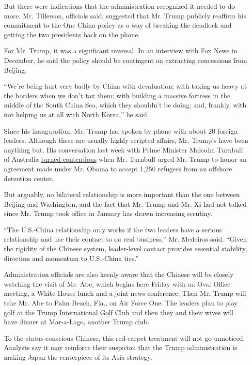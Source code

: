 But there were indications that the administration recognized it needed
to do more. Mr. Tillerson, officials said, suggested that Mr. Trump
publicly reaffirm his commitment to the One China policy as a way of
breaking the deadlock and getting the two presidents back on the phone.

For Mr. Trump, it was a significant reversal. In an interview with Fox
News in December, he said the policy should be contingent on extracting
concessions from Beijing.

``We're being hurt very badly by China with devaluation; with taxing us
heavy at the borders when we don't tax them; with building a massive
fortress in the middle of the South China Sea, which they shouldn't be
doing; and, frankly, with not helping us at all with North Korea,'' he
said.

Since his inauguration, Mr. Trump has spoken by phone with about 20
foreign leaders. Although these are usually highly scripted affairs, Mr.
Trump's have been anything but. His conversation last week with Prime
Minister Malcolm Turnbull of Australia
\href{https://www.nytimes.com/2017/02/02/us/politics/us-australia-trump-turnbull.html}{turned
contentious} when Mr. Turnbull urged Mr. Trump to honor an agreement
made under Mr. Obama to accept 1,250 refugees from an offshore detention
center.

But arguably, no bilateral relationship is more important than the one
between Beijing and Washington, and the fact that Mr. Trump and Mr. Xi
had not talked since Mr. Trump took office in January has drawn
increasing scrutiny.

``The U.S.-China relationship only works if the two leaders have a
serious relationship and use their contact to do real business,'' Mr.
Medeiros said. ``Given the rigidity of the Chinese system, leader-level
contact provides essential stability, direction and momentum to
U.S.-China ties.''

Administration officials are also keenly aware that the Chinese will be
closely watching the visit of Mr. Abe, which begins here Friday with an
Oval Office meeting, a White House lunch and a joint news conference.
Then Mr. Trump will take Mr. Abe to Palm Beach, Fla., on Air Force One.
The leaders plan to play golf at the Trump International Golf Club and
then they and their wives will have dinner at Mar-a-Lago, another Trump
club.

To the status-conscious Chinese, this red-carpet treatment will not go
unnoticed. Analysts say it may reinforce their suspicion that the Trump
administration is making Japan the centerpiece of its Asia strategy.

